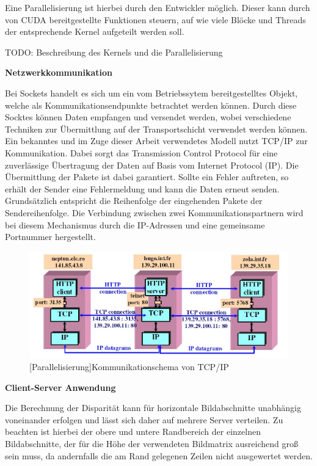 \documentclass[times, 10pt,twocolumn]{article}
\begin{document}
Eine Parallelisierung ist hierbei durch den Entwickler möglich. Dieser kann durch von CUDA bereitgestellte Funktionen steuern, auf wie viele Blöcke und Threads der entsprechende Kernel aufgeteilt werden soll.

TODO: Beschreibung des Kernels und die Parallelisierung


\textbf{Netzwerkkommunikation}

Bei Sockets handelt es sich um ein vom Betriebssytem bereitgestelltes Objekt, welche als Kommunikationsendpunkte betrachtet werden können. Durch diese Socktes können Daten empfangen und versendet werden, wobei verschiedene Techniken zur Übermittlung auf der Transportschicht verwendet werden können.
Ein bekanntes und im Zuge dieser Arbeit verwendetes Modell nutzt TCP/IP zur Kommunikation. Dabei sorgt das Transmission Control Protocol für eine zuverlässige Übertragung der Daten auf Basis vom Internet Protocol (IP). Die Übermittlung der Pakete ist dabei garantiert. Sollte ein Fehler auftreten, so erhält der Sender eine Fehlermeldung und kann die Daten erneut senden. Grundsätzlich entspricht die Reihenfolge der eingehenden Pakete der Sendereihenfolge.
Die Verbindung zwischen zwei Kommunikationspartnern wird bei diesem Mechanismus durch die IP-Adressen und eine gemeinsame Portnummer hergestellt.


 \begin{figure}[!ht]
	\centering
	\includegraphics[width=0.9\linewidth]{image/ip-tcp.jpg}
	[Parallelisierung]{Kommunikationschema von TCP/IP}
	\label{fig:gpu}
\end{figure}

\textbf{Client-Server Anwendung}

Die Berechnung der Disparität kann für horizontale Bildabschnitte unabhängig voneinander erfolgen und lässt sich daher auf mehrere Server verteilen. Zu beachten ist hierbei der obere und untere Randbereich der einzelnen Bildabschnitte, der für die Höhe der verwendeten Bildmatrix ausreichend groß sein muss, da andernfalls die am Rand gelegenen Zeilen nicht ausgewertet werden.
\end{document}
